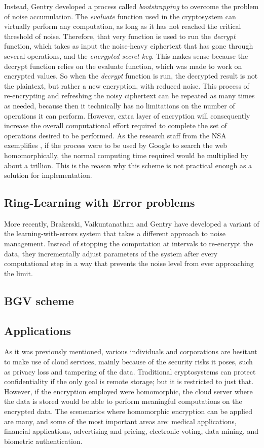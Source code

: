 Instead, Gentry developed a process called \emph{bootstrapping} to overcome the problem of noise accumulation. The \emph{evaluate} function used in the cryptosystem can virtually perform any computation, as long as it has not reached the critical threshold of noise. Therefore, that very function is used to run the \emph{decrypt} function, which takes as input the noise-heavy ciphertext that has gone through several operations, and the \emph{encrypted secret key}. This makes sense because the decrypt function relies on the evaluate function, which was made to work on encrypted values. So when the \emph{decrypt} function is run, the decrypted result is not the plaintext, but rather a new encryption, with reduced noise. This process of re-encrypting and refreshing the noisy ciphertext can be repeated as many times as needed, because then it technically has no limitations on the number of operations it can perform. However, extra layer of encryption will consequently increase the overall computational effort required to complete the set of operations desired to be performed. As the research staff from the NSA exemplifies \cite{NSA2014}, if the process were to be used by Google to search the web homomorphically, the normal computing time required would be multiplied by about a trillion. This is the reason why this scheme is not practical enough as a solution for implementation.

\subsection{Ring-Learning with Error problems}


\cite{Hayes2012} More recently, Brakerski, Vaikuntanathan and Gentry have developed a variant of the learning-with-errors system that takes a different approach to noise management. Instead of stopping the computation at intervals to re-encrypt the data, they incrementally adjust parameters of the system after every computational step in a way that prevents the noise level from ever approaching the limit.

\subsection{BGV scheme}


\subsection{Applications}

As it was previously mentioned, various individuals and corporations are hesitant to make use of cloud services, mainly because of the security risks it poses, such as privacy loss and tampering of the data. Traditional cryptosystems can protect confidentiality if the only goal is remote storage; but it is restricted to just that. However, if the encryption employed were homomorphic, the cloud server where the data is stored would be able to perform meaningful computations on the encrypted data.  The scenenarios where homomorphic encryption can be applied are many, and some of the most important areas are: medical applications, financial applications, advertising and pricing, electronic voting, data mining, and biometric authentication.

